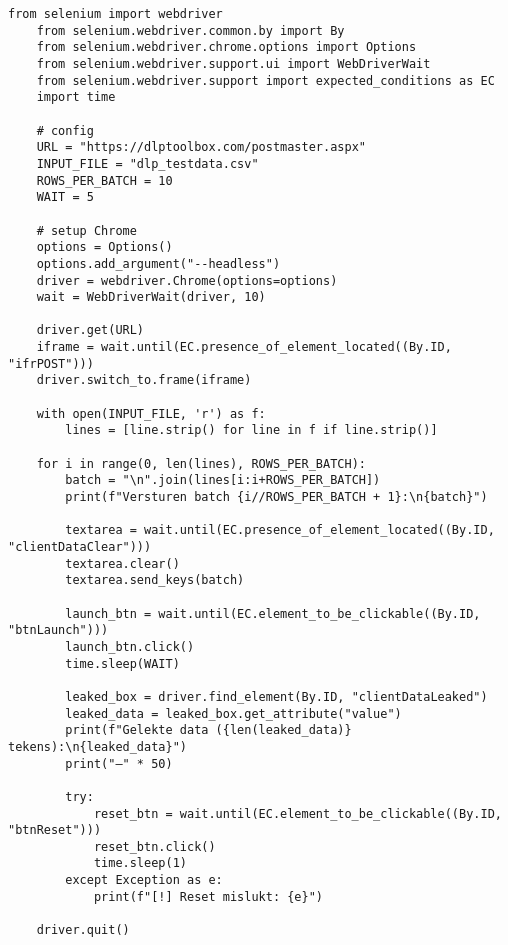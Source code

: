 
\begin{lstlisting}[style=custompython,caption={Selenium-script voor batchgewijze verzending van testdata},label={lst:dlp-script}, captionpos=b]
    from selenium import webdriver
    from selenium.webdriver.common.by import By
    from selenium.webdriver.chrome.options import Options
    from selenium.webdriver.support.ui import WebDriverWait
    from selenium.webdriver.support import expected_conditions as EC
    import time
    
    # config
    URL = "https://dlptoolbox.com/postmaster.aspx"
    INPUT_FILE = "dlp_testdata.csv"
    ROWS_PER_BATCH = 10
    WAIT = 5
    
    # setup Chrome
    options = Options()
    options.add_argument("--headless")
    driver = webdriver.Chrome(options=options)
    wait = WebDriverWait(driver, 10)
    
    driver.get(URL)
    iframe = wait.until(EC.presence_of_element_located((By.ID, "ifrPOST")))
    driver.switch_to.frame(iframe)
    
    with open(INPUT_FILE, 'r') as f:
        lines = [line.strip() for line in f if line.strip()]
    
    for i in range(0, len(lines), ROWS_PER_BATCH):
        batch = "\n".join(lines[i:i+ROWS_PER_BATCH])
        print(f"Versturen batch {i//ROWS_PER_BATCH + 1}:\n{batch}")
    
        textarea = wait.until(EC.presence_of_element_located((By.ID, "clientDataClear")))
        textarea.clear()
        textarea.send_keys(batch)
    
        launch_btn = wait.until(EC.element_to_be_clickable((By.ID, "btnLaunch")))
        launch_btn.click()
        time.sleep(WAIT)
    
        leaked_box = driver.find_element(By.ID, "clientDataLeaked")
        leaked_data = leaked_box.get_attribute("value")
        print(f"Gelekte data ({len(leaked_data)} tekens):\n{leaked_data}")
        print("—" * 50)
    
        try:
            reset_btn = wait.until(EC.element_to_be_clickable((By.ID, "btnReset")))
            reset_btn.click()
            time.sleep(1)
        except Exception as e:
            print(f"[!] Reset mislukt: {e}")
    
    driver.quit()
\end{lstlisting}

